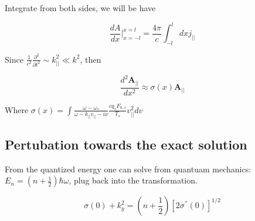 Integrate from both sides, we will be have

\begin{equation}
    \frac{dA}{dx}|^{x=l}_{x=-l} = \frac{4\pi}{c}\int ^{l}_{-l}dx j_{||}
\end{equation}

Since $\frac{1}{c^2}\frac{\partial ^2 }{\partial t^2} \sim k_{||}^2 \ll k^2$, then 

\begin{equation}
    \frac{d^2\textbf{A}_{||}}{dx^2} \approx \sigma(x) \textbf{A}_{||}
    \label{eq:A2}
\end{equation}

Where $\sigma(x)=\int\frac{\omega-\omega_*}{\omega - k_{||}v_{||}-i\nu}\frac{cq_sF_{0,s}}{T_s}v_{||}^2dv$

\subsection{Pertubation towards the exact solution}

From the quantized energy one can solve from quantuam mechanics: $E_n= (n+\frac{1}{2})\hbar \omega$, plug back into the transformation. 

\begin{equation}
    \sigma(0) +k_y^2 = (n+\frac{1}{2})\left[ 2 \sigma^{''}(0)\right]^{1/2}
\end{equation}



